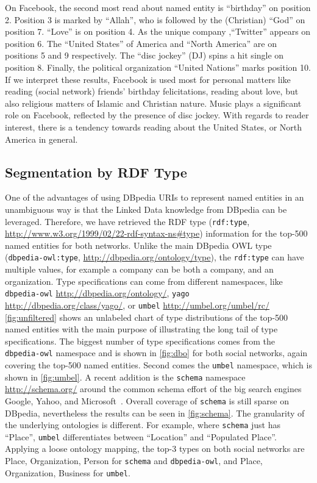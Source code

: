 \documentclass{iosart2c}
\begin{document}
On Facebook, the second most read about named entity is ``birthday'' on position 2.
Position 3 is marked by ``Allah'', who is followed by the (Christian) ``God'' on position 7.
``Love'' is on position 4.
As the unique company ,``Twitter'' appears on position 6.
The ``United States'' of America and ``North America'' are on positions 5 and 9 respectively.
The ``disc jockey'' (DJ) spins a hit single on position 8.
Finally, the political organization ``United Nations'' marks position 10.
If we interpret these results, Facebook is used most for personal matters like reading (social network) friends' birthday felicitations, reading about love, but also religious matters of Islamic and Christian nature.
Music plays a significant role on Facebook, reflected by the presence of disc jockey.
With regards to reader interest, there is a tendency towards reading about the United States, or North America in general.

\subsection{Segmentation by RDF Type}
One of the advantages of using DBpedia URIs to represent named entities in an unambiguous way is that the Linked Data knowledge from DBpedia can be leveraged.
Therefore, we have retrieved the RDF type (\texttt{rdf:type}, \url{http://www.w3.org/1999/02/22-rdf-syntax-ns\#type}) information for the top-500 named entities for both networks.
Unlike the main DBpedia OWL type (\texttt{dbpedia-owl:type}, \url{http://dbpedia.org/ontology/type}), the \texttt{rdf:type} can have multiple values, for example a company can be both a company, and an organization.
Type specifications can come from different namespaces, like \texttt{dbpedia-owl} \url{http://dbpedia.org/ontology/}, \texttt{yago} \url{http://dbpedia.org/class/yago/}, or \texttt{umbel} \url{http://umbel.org/umbel/rc/}
\autoref{fig:unfiltered} shows an unlabeled chart of type distributions of the top-500 named entities with the main purpose of illustrating the long tail of type specifications. 
The biggest number of type specifications comes from the \texttt{dbpedia-owl} namespace and is shown in \autoref{fig:dbo} for both social networks, again covering the top-500 named entities.
Second comes the \texttt{umbel} namespace, which is shown in \autoref{fig:umbel}.
A recent addition is the \texttt{schema} namespace \url{http://schema.org/} around the common schema effort of the big search engines Google, Yahoo, and Microsoft~\cite{schemaorg}.
Overall coverage of \texttt{schema} is still sparse on DBpedia, nevertheless the results can be seen in \autoref{fig:schema}.
The granularity of the underlying ontologies is different.
For example, where \texttt{schema} just has ``Place'', \texttt{umbel} differentiates between ``Location'' and ``Populated Place''.
Applying a loose ontology mapping, the top-3 types on both social networks are Place, Organization, Person for \texttt{schema} and \texttt{dbpedia-owl}, and Place, Organization, Business for \texttt{umbel}.
\end{document}
